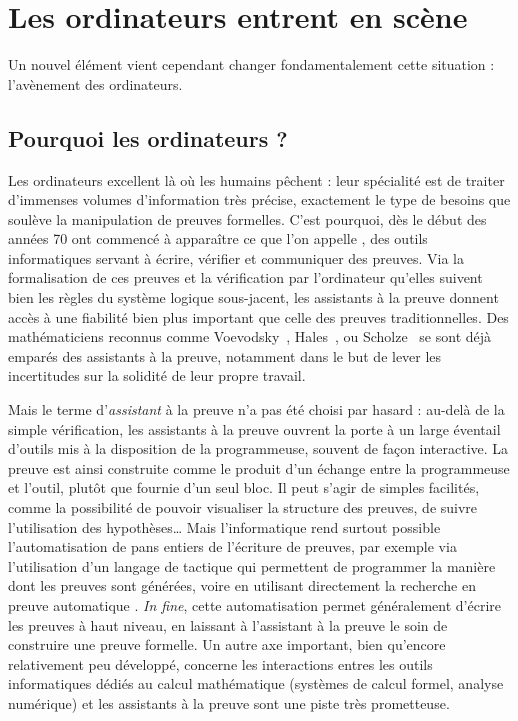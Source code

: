 \section{Les ordinateurs entrent en scène}
\label{sec:assistants-preuve}

Un nouvel élément vient cependant changer fondamentalement cette situation :
l’avènement des ordinateurs.

\subsection{Pourquoi les ordinateurs ?}

Les ordinateurs excellent là où les humains pêchent : leur spécialité est de traiter
d’immenses volumes d’information très précise, exactement le type
de besoins que soulève la manipulation de preuves formelles. C’est pourquoi, dès
le début des années 70
ont commencé à apparaître ce que l’on appelle , des outils informatiques servant à écrire, vérifier et communiquer des
preuves.
Via la formalisation de ces preuves et la vérification par l’ordinateur qu’elles
suivent bien les règles du système logique sous-jacent, les assistants à la preuve
donnent accès à une fiabilité bien plus important que celle des preuves
traditionnelles. Des mathématiciens reconnus comme
Voevodsky~,
Hales~,
ou Scholze~
se sont déjà emparés des assistants à la preuve,
notamment dans le but de lever les incertitudes
sur la solidité de leur propre travail.

Mais le terme d’\emph{assistant} à la preuve n’a pas été choisi par hasard : au-delà
de la simple vérification, les assistants à la preuve ouvrent la porte à un large
éventail d’outils mis à la disposition de la programmeuse, souvent de façon
interactive. La preuve est ainsi construite comme le produit d’un échange entre 
la programmeuse et l’outil, plutôt que fournie d’un seul bloc.
Il peut s’agir de simples
facilités, comme la possibilité de pouvoir visualiser la structure des
preuves, de suivre l’utilisation des hypothèses…
Mais l’informatique rend surtout possible l’automatisation de pans entiers
de l’écriture de preuves,
par exemple via l’utilisation d’un langage de tactique 
qui permettent de programmer la manière dont les preuves sont
générées, voire en utilisant directement la recherche en preuve automatique
.
\textit{In fine}, cette automatisation permet généralement d’écrire
les preuves à haut niveau, en laissant à l’assistant à la preuve le soin
de construire une preuve formelle.
Un autre axe important, bien qu’encore relativement peu développé, concerne
les interactions entres les outils informatiques dédiés au calcul mathématique
(systèmes de calcul formel, analyse numérique) et les assistants à la
preuve sont une piste très prometteuse.

